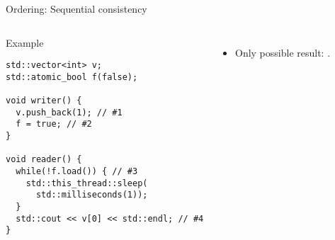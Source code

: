 \begin{frame}[fragile]{Ordering: Sequential consistency}

\begin{columns}[T]


\begin{block}{Example}
\begin{lstlisting}
std::vector<int> v; 
std::atomic_bool f(false); 

void writer() { 
  v.push_back(1); // #1
  f = true; // #2
}

void reader() { 
  while(!f.load()) { // #3
    std::this_thread::sleep(
      std::milliseconds(1)); 
  }
  std::cout << v[0] << std::endl; // #4
} 
\end{lstlisting}
\end{block}




\begin{itemize}
  \item Only possible result: .
\end{itemize}
\end{columns}

\end{frame}


